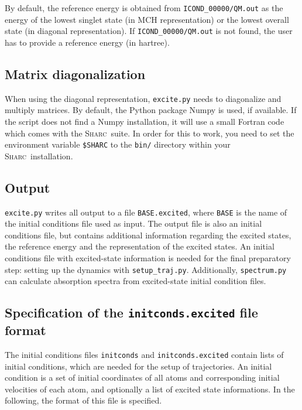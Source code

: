\documentclass[a4paper,11pt,DIV=15,openany,twoside=false]{scrbook}
\newcommand{\sharc}{\textsc{Sharc}}
\newcommand{\ttt}[1]{\texttt{#1}}
\begin{document}
By default, the reference energy is obtained from \ttt{ICOND\_00000/QM.out} as the energy of the lowest singlet state (in MCH representation) or the lowest overall state (in diagonal representation). If \ttt{ICOND\_00000/QM.out} is not found, the user has to provide a reference energy (in hartree).

\subsection{Matrix diagonalization}

When using the diagonal representation, \ttt{excite.py} needs to diagonalize and multiply matrices. By default, the Python package Numpy is used, if available. If the script does not find a Numpy installation, it will use a small Fortran code which comes with the \sharc\ suite. In order for this to work, you need to set the environment variable \ttt{\$SHARC} to the \ttt{bin/} directory within your \sharc\ installation. 

\subsection{Output}

\ttt{excite.py} writes all output to a file \ttt{BASE.excited}, where \ttt{BASE} is the name of the initial conditions file used as input. The output file is also an initial conditions file, but contains additional information regarding the excited states, the reference energy and the representation of the excited states. An initial conditions file with excited-state information is needed for the final preparatory step: setting up the dynamics with \ttt{setup\_traj.py}.
Additionally, \ttt{spectrum.py} can calculate absorption spectra from excited-state initial condition files.

\subsection{Specification of the \ttt{initconds.excited} file format}\label{sec:initcondsfile}

The initial conditions files \ttt{initconds} and \ttt{initconds.excited} contain lists of initial conditions, which are needed for the setup of trajectories. An initial condition is a set of initial coordinates of all atoms and corresponding initial velocities of each atom, and optionally a list of excited state informations. In the following, the format of this file is specified.
\end{document}
